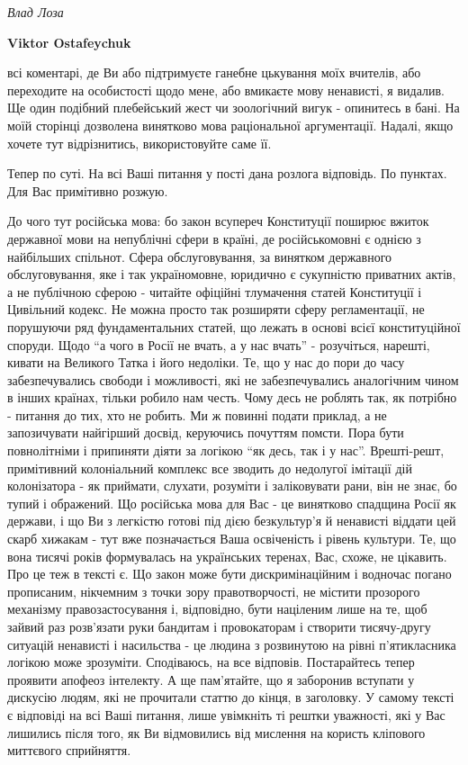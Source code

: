 \begin{itemize}
\emph{Влад Лоза}

\textbf{Viktor Ostafeychuk} 

всі коментарі, де Ви або підтримуєте ганебне цькування моїх вчителів, або
переходите на особистості щодо мене, або вмикаєте мову ненависті, я видалив. Ще
один подібний плебейський жест чи зоологічний вигук - опинитесь в бані. На моїй
сторінці дозволена винятково мова раціональної аргументації. Надалі, якщо
хочете тут відрізнитись, використовуйте саме її. 

Тепер по суті. На всі Ваші питання у пості дана розлога відповідь. По пунктах.
Для Вас примітивно розжую.

До чого тут російська мова: бо закон всупереч Конституції поширює вжиток
державної мови на непублічні сфери в країні, де російськомовні є однією з
найбільших спільнот. Сфера обслуговування, за винятком державного
обслуговування, яке і так україномовне, юридично є сукупністю приватних актів,
а не публічною сферою - читайте офіційні тлумачення статей Конституції і
Цивільний кодекс. Не можна просто так розширяти сферу регламентації, не
порушуючи ряд фундаментальних статей, що лежать в основі всієї конституційної
споруди. Щодо \enquote{а чого в Росії не вчать, а у нас вчать} - розучіться, нарешті,
кивати на Великого Татка і його недоліки. Те, що у нас до пори до часу
забезпечувались свободи і можливості, які не забезпечувались аналогічним чином
в інших країнах, тільки робило нам честь. Чому десь не роблять так, як потрібно
- питання до тих, хто не робить. Ми ж повинні подати приклад, а не запозичувати
найгірший досвід, керуючись почуттям помсти. Пора бути повнолітніми і припиняти
діяти за логікою \enquote{як десь, так і у нас}. Врешті-решт, примітивний колоніальний
комплекс все зводить до недолугої імітації дій колонізатора - як приймати,
слухати, розуміти і заліковувати рани, він не знає, бо тупий і ображений. Що
російська мова для Вас - це винятково спадщина Росії як держави, і що Ви з
легкістю готові під дією безкультур'я й ненависті віддати цей скарб хижакам -
тут вже позначається Ваша освіченість і рівень культури. Те, що вона тисячі
років формувалась на українських теренах, Вас, схоже, не цікавить. Про це теж в
тексті є. Що закон може бути дискримінаційним і водночас погано прописаним,
нікчемним з точки зору правотворчості, не містити прозорого механізму
правозастосування і, відповідно, бути націленим лише на те, щоб зайвий раз
розв'язати руки бандитам і провокаторам і створити тисячу-другу ситуацій
ненависті і насильства - це людина з розвинутою на рівні п'ятикласника логікою
може зрозуміти. Сподіваюсь, на все відповів. Постарайтесь тепер проявити
апофеоз інтелекту. А ще пам'ятайте, що я заборонив вступати у дискусію людям,
які не прочитали статтю до кінця, в заголовку. У самому тексті є відповіді на
всі Ваші питання, лише увімкніть ті рештки уважності, які у Вас лишились після
того, як Ви відмовились від мислення на користь кліпового миттєвого сприйняття.


\end{itemize}
